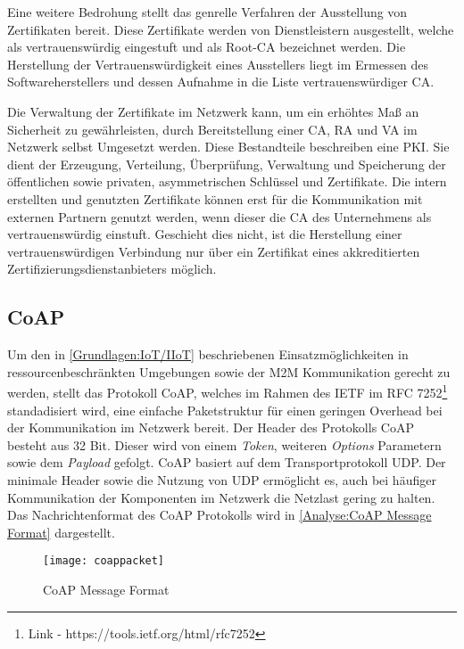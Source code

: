 Eine weitere Bedrohung stellt das genrelle Verfahren der Ausstellung von Zertifikaten bereit. Diese Zertifikate werden von Dienstleistern ausgestellt, welche als vertrauenswürdig eingestuft und als Root-\ac{CA} bezeichnet werden. Die Herstellung der Vertrauenswürdigkeit eines Ausstellers liegt im Ermessen des Softwareherstellers und dessen Aufnahme in die Liste vertrauenswürdiger \ac{CA}. 

Die Verwaltung der Zertifikate im Netzwerk kann, um ein erhöhtes Maß an Sicherheit zu gewährleisten, durch Bereitstellung einer \ac{CA}, \ac{RA} und \ac{VA} im Netzwerk selbst Umgesetzt werden. Diese Bestandteile beschreiben eine \ac{PKI}. Sie dient der Erzeugung, Verteilung, Überprüfung, Verwaltung und Speicherung der öffentlichen sowie privaten, asymmetrischen Schlüssel und Zertifikate. Die intern erstellten und genutzten Zertifikate können erst für die Kommunikation mit externen Partnern genutzt werden, wenn dieser die \ac{CA} des Unternehmens als vertrauenswürdig einstuft. Geschieht dies nicht, ist die Herstellung einer vertrauenswürdigen Verbindung nur über ein Zertifikat eines akkreditierten Zertifizierungsdienstanbieters möglich.

\subsection{\ac{CoAP}}
Um den in \autoref{Grundlagen:IoT/IIoT} beschriebenen Einsatzmöglichkeiten in ressourcenbeschränkten Umgebungen sowie der \ac{M2M} Kommunikation gerecht zu werden, stellt das Protokoll \ac{CoAP}, welches im Rahmen des \ac{IETF} im RFC 7252\footnote{Link - https://tools.ietf.org/html/rfc7252} standadisiert wird, eine einfache Paketstruktur für einen geringen Overhead bei der Kommunikation im Netzwerk bereit. Der Header des Protokolls \ac{CoAP} besteht aus 32 Bit. Dieser wird von einem \textit{Token}, weiteren \textit{Options} Parametern sowie dem \textit{Payload} gefolgt. \ac{CoAP} basiert auf dem Transportprotokoll \ac{UDP}. Der minimale Header sowie die Nutzung von \ac{UDP} ermöglicht es, auch bei häufiger Kommunikation der Komponenten im Netzwerk die Netzlast gering zu halten. Das Nachrichtenformat des \ac{CoAP} Protokolls wird in \autoref{Analyse:CoAP Message Format} dargestellt.

\begin{figure}[h]
  \centering
  \texttt{[image: coappacket]}
  \caption{CoAP Message Format} 
  \label{Analyse:CoAP Message Format}
\end{figure}

